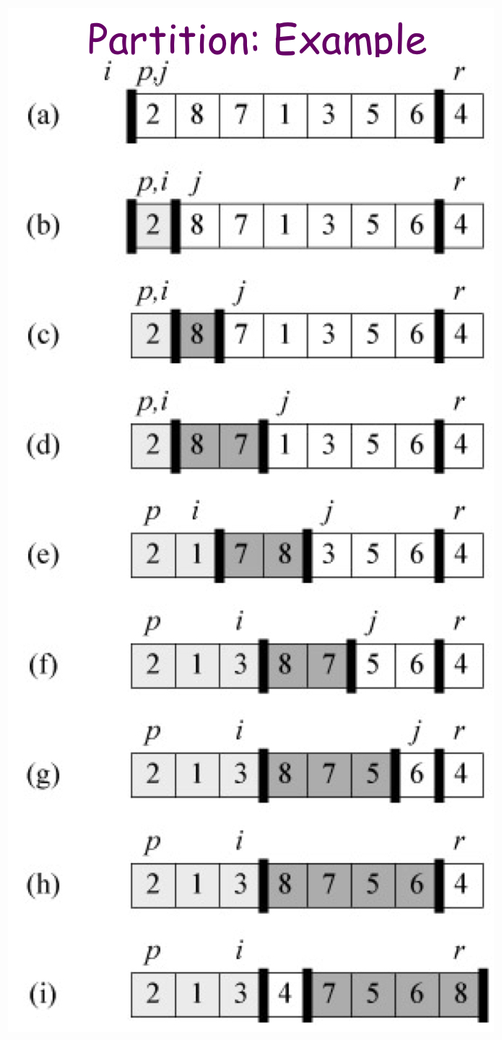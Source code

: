 \begin{spacing}{1.3}
    \begin{center}
        \includegraphics[scale=0.2]{images/03-partition-eg.jpeg}
    \end{center}


\end{spacing}
